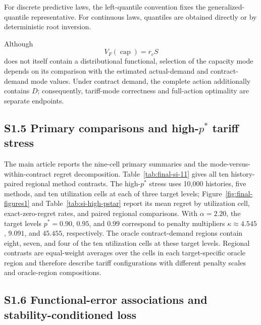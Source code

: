 \documentclass[]{interact}
\begin{document}
For discrete predictive laws, the left-quantile convention fixes the
generalized-quantile representative. For continuous laws, quantiles
are obtained directly or by deterministic root inversion.

Although
\[
V_F(\operatorname{cap})=r_cS
\]
does not itself contain a distributional functional, selection of the
capacity mode depends on its comparison with the estimated
actual-demand and contract-demand mode values. Under contract demand,
the complete action additionally contains \(D\); consequently,
tariff-mode correctness and full-action optimality are separate
endpoints.




\subsection*{S1.5 Primary comparisons and high-$p^*$ tariff stress}

The main article reports the nine-cell primary summaries and the
mode-versus-within-contract regret decomposition. Table~\ref{tab:final-si-11} gives all ten
history-paired regional method contrasts. The high-$p^*$ stress uses
10,000 histories, five methods, and ten utilization cells at each of
three target levels; Figure~\ref{fig:final-figures1} and
Table~\ref{tab:si-high-pstar} report its mean regret by utilization
cell, exact-zero-regret rates, and paired regional comparisons.
With $\alpha=2.20$, the target levels $p^*=0.90$, $0.95$, and $0.99$
correspond to penalty multipliers $\kappa\approx4.545$, $9.091$, and
$45.455$, respectively. The oracle contract-demand regions contain
eight, seven, and four of the ten utilization cells at these target
levels. Regional contrasts are equal-weight averages over the cells in
each target-specific oracle region and therefore describe tariff
configurations with different penalty scales and oracle-region
compositions.


\subsection*{S1.6 Functional-error associations and stability-conditioned loss}
\end{document}
